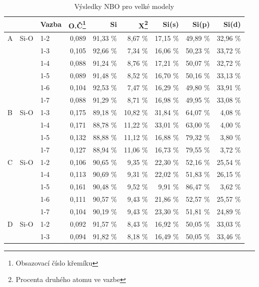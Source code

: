 \documentclass[
  digital, %
  table,   %
  lof,     %
  lot,     %
  oneside,
]{fithesis3}
\begin{document}
\begin{table}
\caption{Výsledky NBO pro velké modely}
\begin{minipage}{\textwidth}
\begin{center}
\begin{tabular}{|l|l|l|r|r|r|r|r|r|}
\hline
 \label{nbo_large}&  & Vazba & O.Č\footnote{Obsazovací číslo křemíku} & Si & X\footnote{Procenta druhého atomu ve vazbe} & Si(s) & Si(p) &Si(d) \\ \hline
A & Si-O & 1-2  & 0,089 & 91,33 \% & 8,67 \% & 17,15 \% & 49,89 \% & 32,96 \% \\ \hline
 &  & 1-3  & 0,105 & 92,66 \% & 7,34 \% & 16,06 \% & 50,23 \% & 33,72 \% \\ \hline
 &  & 1-4  & 0,088 & 91,24 \% & 8,76 \% & 17,21 \% & 50,07 \% & 32,72 \% \\ \hline
 &  & 1-5  & 0,089 & 91,48 \% & 8,52 \% & 16,70 \% & 50,16 \% & 33,13 \% \\ \hline
 &  & 1-6 & 0,104 & 92,53 \% & 7,47 \% & 16,29 \% & 49,80 \% & 33,91 \% \\ \hline
 &  & 1-7 & 0,088 & 91,29 \% & 8,71 \% & 16,98 \% & 49,95 \% & 33,08 \% \\ \hline
B & Si-O & 1-3  & 0,175 & 89,18 \% & 10,82 \% & 31,84 \% & 64,07 \% & 4,08 \% \\ \hline
 &  & 1-4  & 0,171 & 88,78 \% & 11,22 \% & 33,01 \% & 63,00 \% & 4,00 \% \\ \hline
 &  & 1-5  & 0,132 & 88,88 \% & 11,12 \% & 16,88 \% & 79,32 \% & 3,80 \% \\ \hline
 &  & 1-7 & 0,127 & 88,94 \% & 11,06 \% & 16,73 \% & 79,55 \% & 3,72 \% \\ \hline
C & Si-O & 1-2  & 0,106 & 90,65 \% & 9,35 \% & 22,30 \% & 52,16 \% & 25,54 \% \\ \hline
 &  & 1-4  & 0,113 & 90,69 \% & 9,31 \% & 22,02 \% & 51,83 \% & 26,15 \% \\ \hline
 &  & 1-5  & 0,161 & 90,48 \% & 9,52 \% & 9,91 \% & 86,47 \% & 3,62 \% \\ \hline
 &  & 1-6 & 0,111 & 90,57 \% & 9,43 \% & 21,86 \% & 52,57 \% & 25,57 \% \\ \hline
 &  & 1-7 & 0,104 & 90,19 \% & 9,43 \% & 23,30 \% & 51,81 \% & 24,89 \% \\ \hline
D & Si-O & 1-2  & 0,092 & 91,57 \% & 8,43 \% & 16,92 \% & 50,05 \% & 33,03 \% \\ \hline
 &  & 1-3  & 0,094 & 91,82 \% & 8,18 \% & 16,49 \% & 50,05 \% & 33,46 \% \\ \hline

\end{tabular}
\end{center}
\end{minipage}
\end{table}
\end{document}
